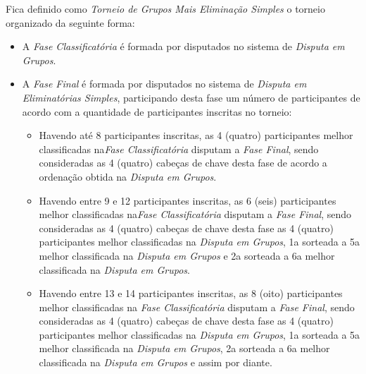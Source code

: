 \noindent
Fica definido como \textit{Torneio de Grupos Mais Eliminação Simples} o torneio organizado da seguinte forma:
\begin{itemize}[noitemsep]
	\item A \textit{Fase Classificatória} é formada por disputados no sistema de \textit{Disputa em Grupos}.

	\item A \textit{Fase Final} é formada por disputados no sistema de \textit{Disputa em Eliminatórias Simples}, participando desta fase um número de participantes de acordo com a quantidade de participantes inscritas no torneio:
	\begin{itemize}[noitemsep]
		\item Havendo até 8 participantes inscritas, as 4 (quatro) participantes melhor classificadas na\textit {Fase Classificatória} disputam a \textit{Fase Final}, sendo consideradas as 4 (quatro) cabeças de chave desta fase de acordo a ordenação obtida na \textit{Disputa em Grupos}.
		\item Havendo entre 9 e 12 participantes inscritas, as 6 (seis) participantes melhor classificadas na\textit {Fase Classificatória} disputam a \textit{Fase Final}, sendo consideradas as 4 (quatro) cabeças de chave desta fase as 4 (quatro) participantes melhor classificadas na \textit{Disputa em Grupos}, 1a sorteada a 5a melhor classificada na \textit{Disputa em Grupos} e 2a sorteada a 6a melhor classificada na \textit{Disputa em Grupos}.
		\item Havendo entre 13 e 14 participantes inscritas, as 8 (oito) participantes melhor classificadas na \textit{Fase Classificatória} disputam a \textit{Fase Final}, sendo consideradas as 4 (quatro) cabeças de chave desta fase as 4 (quatro) participantes melhor classificadas na \textit{Disputa em Grupos}, 1a sorteada a 5a melhor classificada na \textit{Disputa em Grupos}, 2a sorteada a 6a melhor classificada na \textit{Disputa em Grupos} e assim por diante.
	\end{itemize}


\end{itemize}
